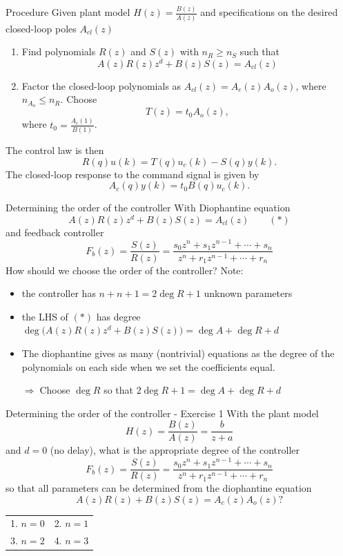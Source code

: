 \documentclass[presentation,aspectratio=169]{beamer}
\begin{document}
\begin{frame}[label=sec-3-1]{Procedure}
Given plant model \(H(z)=\frac{B(z)}{A(z)}\) and specifications on the desired closed-loop poles \(A_{cl}(z)\)
\begin{enumerate}
\item Find polynomials \(R(z)\) and \(S(z)\) with \(n_R \ge n_S\) such that 
\[ A(z)R(z)z^{d} + B(z)S(z) = A_{cl}(z) \]
\item Factor the closed-loop polynomials as \(A_{cl}(z) = A_c(z)A_o(z)\), where \(n_{A_o} \le n_R\). Choose
\[T(z) = t_0 A_o(z),\] where \(t_0 = \frac{A_c(1)}{B(1)}\).
\end{enumerate}

The control law is then
\[ R(q) u(k) = T(q)u_c(k) - S(q)y(k). \]
The closed-loop response to the command signal is given by
\[ A_c(q)y(k) = t_0 B(q) u_c(k). \]
\end{frame}
\begin{frame}[label=sec-3-2]{Determining the order of the controller}
With Diophantine equation 
   \[ A(z)R(z)z^{d} + B(z)S(z) = A_{cl}(z) \qquad (*) \]
and feedback controller
\[F_b(z) = \frac{S(z)}{R(z)} = \frac{s_0z^n + s_1z^{n-1} + \cdots + s_n}{z^n + r_1 z^{n-1} + \cdots + r_n}\]
\alert{How should we choose the order of the controller?} Note:
\begin{itemize}
\item the controller has $n+n+1 = 2\deg R + 1$ unknown parameters
\item the LHS of \((*)\) has degree $\deg \big(A(z)R(z)z^d + B(z)S(z)\big) = \deg A + \deg R + d$
\item The diophantine gives as many (nontrivial) equations as the degree of the polynomials on each side when we set the coefficients equal.

\alert{\(\Rightarrow\;\)Choose \(\deg R\) so that \(2\deg R + 1 = \deg A + \deg R + d\)}
\end{itemize}
\end{frame}


\begin{frame}[label=sec-3-3]{Determining the order of the controller - Exercise 1}
With the plant model \[H(z) = \frac{B(z)}{A(z)} = \frac{b}{z + a}\] and \(d=0\) (no delay), what is the appropriate degree of the controller 
\[F_b(z) = \frac{S(z)}{R(z)} = \frac{s_0z^n + s_1z^{n-1} + \cdots + s_n}{z^n + r_1 z^{n-1} + \cdots + r_n}\]
so that all parameters can be determined from the diophantine equation
\[ A(z)R(z) + B(z)S(z) = A_c(z)A_o(z)?\]
\begin{center}
\begin{tabular}{ll}
1. \(n = 0\) & 2. \(n = 1\)\\
3. \(n=2\) & 4. \(n=3\)\\
\end{tabular}
\end{center}
\end{frame}
\end{document}
